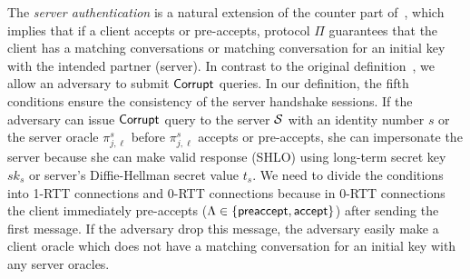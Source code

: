 \begin{remark}
 The \textit{server authentication} is a natural extension
 of the counter part of~\cite{KPW13:SACCE}, which implies
 that if a client accepts or pre-accepts, protocol $\Pi$ guarantees that
 the client has a matching conversations or matching conversation for an initial key
 with the intended
 partner (server). In contrast to the original
 definition~\cite{KPW13:SACCE}, we allow an adversary to
 submit $\mathsf{Corrupt}$ queries.
 In our definition, the fifth conditions ensure the
 consistency of the server handshake sessions.
 If the adversary can issue $\mathsf{Corrupt}$ query to the server
 $\mathcal{S}$ with an identity number $s$ or the server oracle $\pi^s_{j, \ell}$
 before $\pi^s_{j, \ell}$ accepts or pre-accepts, she can
 impersonate the server because she can make valid response
 (SHLO) using long-term secret key $sk_s$ or server's
 Diffie-Hellman secret value $t_s$.
 We need to divide the conditions into 1-RTT connections and 0-RTT connections
 because in 0-RTT connections the client immediately pre-accepts ($\Lambda \in \{\mathsf{preaccept}, \mathsf{accept} \}$)
 after sending the first message. If the adversary drop this message, the adversary
 easily make a client oracle which does not have a matching conversation for an initial key with
 any server oracles.

 \end{remark}

